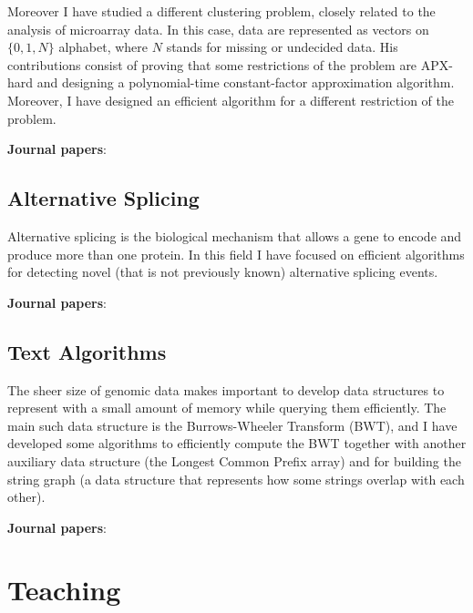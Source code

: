\documentclass[11pt,a4paper,roman]{moderncv}
\begin{document}
Moreover I have studied a different clustering problem, closely related
to the analysis of microarray data. In this case, data are represented
as vectors on \(\{0,1,N\}\) alphabet, where \(N\) stands for missing or
undecided data. His contributions consist of proving that some
restrictions of the problem are APX-hard and designing a polynomial-time
constant-factor approximation algorithm. Moreover, I have designed an
efficient algorithm for a different restriction of the problem.

\textbf{Journal papers}:~\cite{DBLP:journals/titb/CiccolellaPBV21,DBLP:journals/tcs/BonizzoniVD12,DBLP:journals/algorithmica/BonizzoniVDM10,DBLP:journals/jcss/BonizzoniVDJ08}

\subsection{Alternative Splicing}\label{splicing}

Alternative splicing is the biological mechanism that allows a gene to encode
and produce more than one protein.
In this field I have focused on efficient algorithms for detecting novel (that
is not previously known) alternative splicing events.


\textbf{Journal papers}:~\cite{DBLP:journals/bmcbi/DentiRBVPB18,DBLP:journals/jcb/BerettaBVPR14,DBLP:journals/bmcbi/PirolaRPPVB12}

\subsection{Text Algorithms}\label{bwt}

The sheer size of genomic data makes important to develop data structures to
represent with a small amount of memory while querying them efficiently.
The main such data structure is the Burrows-Wheeler Transform (BWT), and I have
developed some algorithms to efficiently compute the BWT together with another
auxiliary data structure (the Longest Common Prefix array) and for building the
string graph (a data structure that represents how some strings overlap with
each other).

\textbf{Journal papers}:~\cite{DBLP:journals/tcs/BonizzoniVPPR21,DBLP:journals/jcb/BonizzoniVPPR19,DBLP:journals/quanbio/RizziBPPPVB19,DBLP:journals/algorithmica/BonizzoniVPPR17,DBLP:journals/jcb/BonizzoniVPPR17,DBLP:journals/jcb/BonizzoniVPPR16}


\section{Teaching}
\end{document}
